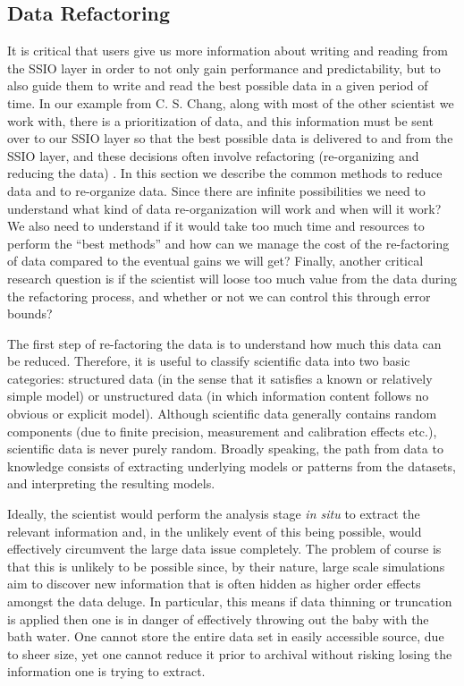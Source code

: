 \subsection{Data Refactoring}

It is critical that users give us more information about writing and reading from the SSIO layer
in order to not only gain performance and predictability, but to also guide them to write and read
the best possible data in a given period of time. In our example from C. S. Chang, along with most
of the other scientist we work with, there is a prioritization of data, and this information must be
sent over to our SSIO layer so that the best possible data is delivered to and from the SSIO layer, 
and these decisions often involve refactoring (re-organizing and reducing the data) . In this section we
describe the common methods to reduce data and to re-organize data. Since there are infinite possibilities 
we need to understand what kind of data re-organization will work and when will it work?  We also need to 
understand if it would take too much time and resources to perform the ``best methods'' and how can we manage the
cost of the re-factoring of data compared to the eventual gains we will get?  Finally, another critical research question
is if the scientist will loose too much value from the data during the refactoring process, and whether or not we can
control this through error bounds? 

The first step of re-factoring the data is to understand how much this data can be reduced.  Therefore, 
it is useful to classify scientific data into two basic categories: structured
data (in the sense that it satisfies a known or relatively simple model) or
unstructured data (in which information content follows no obvious or explicit
model).  Although scientific data generally contains random components (due to
finite precision, measurement and calibration effects etc.), scientific data is
never purely random. Broadly speaking, the path from data to knowledge consists
of extracting underlying models or patterns from the datasets, and interpreting
the resulting models. 

Ideally, the scientist would perform the analysis stage {\em in situ} to
extract the relevant information and, in the unlikely event of this being
possible, would effectively circumvent the large data issue completely.  The
problem of course is that this is unlikely to be possible since, by their
nature, large scale simulations aim to discover new information that is often
hidden as higher order effects amongst the data deluge. In particular, this
means if data thinning or truncation is applied then one is in danger of
effectively throwing out the baby with the bath water. One cannot store the
entire data set in easily accessible source, due to sheer size, yet one cannot
reduce it prior to archival without risking losing the information one is
trying to extract.  

